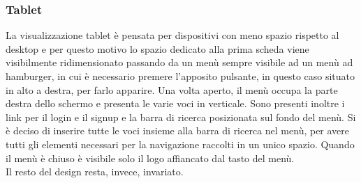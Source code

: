 \subsubsection{Tablet}
\label{ssub:tablet}
La visualizzazione tablet è pensata per dispositivi con meno spazio rispetto al desktop e per questo motivo lo spazio dedicato alla prima scheda viene visibilmente ridimensionato passando da un menù sempre visibile ad un menù ad hamburger, in cui è necessario premere l'apposito pulsante, in questo caso situato in alto a destra, per farlo apparire. Una volta aperto, il menù occupa la parte destra dello schermo e presenta le varie voci in verticale. Sono presenti inoltre i link per il login e il signup e la barra di ricerca posizionata sul fondo del menù. Si è deciso di inserire tutte le voci insieme alla barra di ricerca nel menù, per avere tutti gli elementi necessari per la navigazione raccolti in un unico spazio. Quando il menù è chiuso è visibile solo il logo affiancato dal tasto del menù. \\
Il resto del design resta, invece, invariato.

